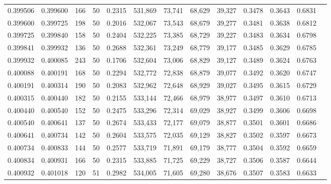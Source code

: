\begin{tabular}{rrrrrrrrrrrrr}
0.399506 & 0.399600 &   166 &  50 &                                     0.2315 & 531,869 &  73,741 &  68,629 &  39,327 & 0.3478 & 0.3643 & 0.6831 \\
0.399600 & 0.399725 &   198 &  50 &                                     0.2016 & 532,067 &  73,543 &  68,679 &  39,277 & 0.3481 & 0.3638 & 0.6812 \\
0.399725 & 0.399840 &   158 &  50 &                                     0.2404 & 532,225 &  73,385 &  68,729 &  39,227 & 0.3483 & 0.3634 & 0.6798 \\
0.399841 & 0.399932 &   136 &  50 &                                     0.2688 & 532,361 &  73,249 &  68,779 &  39,177 & 0.3485 & 0.3629 & 0.6785 \\
0.399932 & 0.400085 &   243 &  50 &                                     0.1706 & 532,604 &  73,006 &  68,829 &  39,127 & 0.3489 & 0.3624 & 0.6763 \\
0.400088 & 0.400191 &   168 &  50 &                                     0.2294 & 532,772 &  72,838 &  68,879 &  39,077 & 0.3492 & 0.3620 & 0.6747 \\
0.400191 & 0.400314 &   190 &  50 &                                     0.2083 & 532,962 &  72,648 &  68,929 &  39,027 & 0.3495 & 0.3615 & 0.6729 \\
0.400315 & 0.400440 &   182 &  50 &                                     0.2155 & 533,144 &  72,466 &  68,979 &  38,977 & 0.3497 & 0.3610 & 0.6713 \\
0.400440 & 0.400540 &   152 &  50 &                                     0.2475 & 533,296 &  72,314 &  69,029 &  38,927 & 0.3499 & 0.3606 & 0.6698 \\
0.400540 & 0.400641 &   137 &  50 &                                     0.2674 & 533,433 &  72,177 &  69,079 &  38,877 & 0.3501 & 0.3601 & 0.6686 \\
0.400641 & 0.400734 &   142 &  50 &                                     0.2604 & 533,575 &  72,035 &  69,129 &  38,827 & 0.3502 & 0.3597 & 0.6673 \\
0.400734 & 0.400833 &   144 &  50 &                                     0.2577 & 533,719 &  71,891 &  69,179 &  38,777 & 0.3504 & 0.3592 & 0.6659 \\
0.400834 & 0.400931 &   166 &  50 &                                     0.2315 & 533,885 &  71,725 &  69,229 &  38,727 & 0.3506 & 0.3587 & 0.6644 \\
0.400932 & 0.401018 &   120 &  51 &                                     0.2982 & 534,005 &  71,605 &  69,280 &  38,676 & 0.3507 & 0.3583 & 0.6633 \\

\end{tabular}

